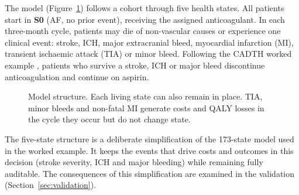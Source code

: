 \documentclass[11pt,letterpaper]{article}
\begin{document}
The model (Figure~\ref{fig:structure}) follows a cohort through five health states. All
patients start in \textbf{S0} (AF, no prior event), receiving the assigned anticoagulant. In
each three-month cycle, patients may die of non-vascular causes or experience one clinical
event: stroke, ICH, major extracranial bleed, myocardial infarction (MI), transient ischaemic
attack (TIA) or minor bleed. Following the CADTH worked example \cite{cadthwe}, patients who
survive a stroke, ICH or major bleed discontinue anticoagulation and continue on aspirin.

\begin{figure}[H]
\centering
{}
\caption{Model structure. Each living state can also remain in place. TIA, minor bleeds and
non-fatal MI generate costs and QALY losses in the cycle they occur but do not change state.}
\label{fig:structure}
\end{figure}

The five-state structure is a deliberate simplification of the 173-state model used in the
worked example. It keeps the events that drive costs and outcomes in this decision (stroke
severity, ICH and major bleeding) while remaining fully auditable. The consequences of this
simplification are examined in the validation (Section~\ref{sec:validation}).
\end{document}
